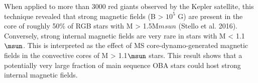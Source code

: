 When applied to more than 3000 red giants observed by the Kepler satellite, this technique revealed that
strong magnetic fields (B > $10^5$ G) are present in the core of roughly 50\% of RGB stars with M > 1.5M$msun$ (Stello et al. 2016).
Conversely, strong internal magnetic fields are very rare in stars with M < 1.1$\msun$. This is interpreted as the
effect of MS core-dynamo-generated magnetic fields in the convective cores of M > 1.1$\msun$ stars.
This result shows that a potentially very large fraction of main sequence OBA stars could host strong internal magnetic fields.




